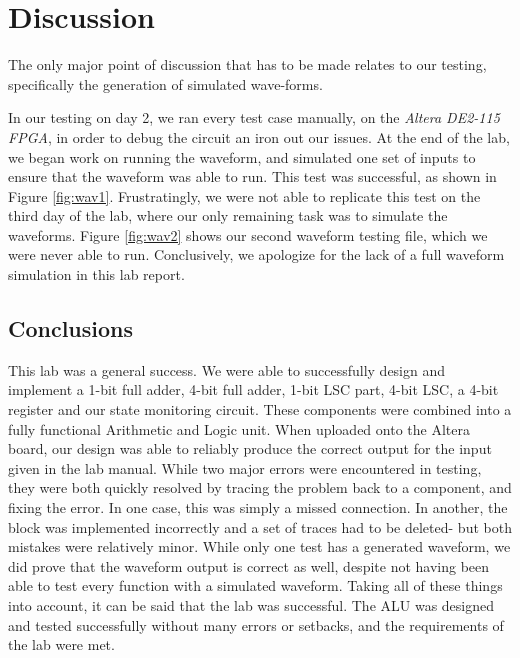 \documentclass[a4paper,12pt]{article}
\begin{document}
\section{Discussion}

The only major point of discussion that has to be made relates to our testing, specifically the generation of simulated wave-forms.

In our testing on day 2, we ran every test case manually, on the  \textit{Altera DE2-115 FPGA}, in order to debug the circuit an iron out our issues. At the end of the lab, we began work on running the waveform, and simulated one set of inputs to ensure that the waveform was able to run. This test was successful, as shown in Figure \ref{fig:wav1}. Frustratingly, we were not able to replicate this test on the third day of the lab, where our only remaining task was to simulate the waveforms. Figure \ref{fig:wav2} shows our second waveform testing file, which we were never able to run. Conclusively, we apologize for the lack of a full waveform simulation in this lab report.

\subsection{Conclusions}

This lab was a general success. We were able to successfully design and implement a 1-bit full adder, 4-bit full adder, 1-bit LSC part, 4-bit LSC, a 4-bit register and our state monitoring circuit. These components were combined into a fully functional Arithmetic and Logic unit. When uploaded onto the Altera board, our design was able to reliably produce the correct output for the input given in the lab manual. While two major errors were encountered in testing, they were both quickly resolved by tracing the problem back to a component, and fixing the error. In one case, this was simply a missed connection. In another, the block was implemented incorrectly and a set of traces had to be deleted- but both mistakes were relatively minor. While only one test has a generated waveform, we did prove that the waveform output is correct as well, despite not having been able to test every function with a simulated waveform. Taking all of these things into account, it can be said that the lab was successful. The ALU was designed and tested successfully without many errors or setbacks, and the requirements of the lab were met.



\vspace*{\fill}
\end{document}
